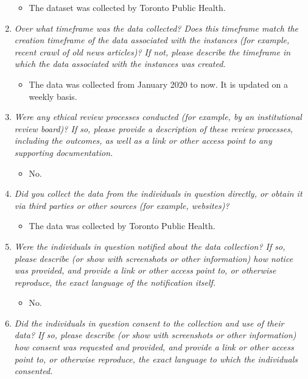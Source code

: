 \documentclass[
]{article}
\providecommand{\tightlist}{%
  \setlength{\itemsep}{0pt}\setlength{\parskip}{0pt}}
\begin{document}
\begin{enumerate}
  \begin{itemize}
  \tightlist
  \item
    The dataset was collected by Toronto Public Health.
  \end{itemize}
\item
  \emph{Over what timeframe was the data collected? Does this timeframe match the creation timeframe of the data associated with the instances (for example, recent crawl of old news articles)? If not, please describe the timeframe in which the data associated with the instances was created.}

  \begin{itemize}
  \tightlist
  \item
    The data was collected from January 2020 to now. It is updated on a weekly basis.
  \end{itemize}
\item
  \emph{Were any ethical review processes conducted (for example, by an institutional review board)? If so, please provide a description of these review processes, including the outcomes, as well as a link or other access point to any supporting documentation.}

  \begin{itemize}
  \tightlist
  \item
    No.
  \end{itemize}
\item
  \emph{Did you collect the data from the individuals in question directly, or obtain it via third parties or other sources (for example, websites)?}

  \begin{itemize}
  \tightlist
  \item
    The data was collected by Toronto Public Health.
  \end{itemize}
\item
  \emph{Were the individuals in question notified about the data collection? If so, please describe (or show with screenshots or other information) how notice was provided, and provide a link or other access point to, or otherwise reproduce, the exact language of the notification itself.}

  \begin{itemize}
  \tightlist
  \item
    No.
  \end{itemize}
\item
  \emph{Did the individuals in question consent to the collection and use of their data? If so, please describe (or show with screenshots or other information) how consent was requested and provided, and provide a link or other access point to, or otherwise reproduce, the exact language to which the individuals consented.}


\end{enumerate}
\end{document}
